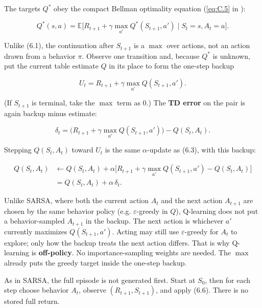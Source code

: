 The targets $Q^*$ obey the compact Bellman optimality equation (\eqref{eq:C.5} in ):

\begin{equation}
Q^*(s,a)
=
\mathbb{E}\bigl[R_{t+1}+\gamma\max_{a'} Q^*(S_{t+1},a')\mid S_t=s,A_t=a\bigr].
\tag{6.4}
\end{equation}

Unlike (6.1), the continuation after $S_{t+1}$ is a $\max$ over actions, not an action drawn from a behavior $\pi$. Observe one transition and, because $Q^*$ is unknown, put the current table estimate $Q$ in its place to form the one-step backup

\[
U_t=R_{t+1}+\gamma\max_{a'} Q(S_{t+1},a').
\]

(If $S_{t+1}$ is terminal, take the $\max$ term as $0$.) The \textbf{TD error} on the pair is again backup minus estimate:

\begin{equation}
\delta_t
=
\bigl(R_{t+1}+\gamma\max_{a'} Q(S_{t+1},a')\bigr) - Q(S_t,A_t).
\tag{6.5}
\end{equation}

Stepping $Q(S_t,A_t)$ toward $U_t$ is the same $\alpha$-update as (6.3), with this backup:

\begin{equation}
\begin{aligned}
Q(S_t,A_t)
&\leftarrow
Q(S_t,A_t)
+
\alpha\bigl[R_{t+1}+\gamma\max_{a'} Q(S_{t+1},a')-Q(S_t,A_t)\bigr]
\\
&=
Q(S_t,A_t)+\alpha\,\delta_t.
\end{aligned}
\tag{6.6}
\end{equation}

Unlike SARSA, where both the current action $A_t$ and the next action $A_{t+1}$ are chosen by the same behavior policy (e.g. $\varepsilon$-greedy in $Q$), Q-learning does not put a behavior-sampled $A_{t+1}$ in the backup. The next action is whichever $a'$ currently maximizes $Q(S_{t+1},a')$. Acting may still use $\varepsilon$-greedy for $A_t$ to explore; only how the backup treats the next action differs. That is why Q-learning is \textbf{off-policy}. No importance-sampling weights are needed. The $\max$ already puts the greedy target inside the one-step backup.

As in SARSA, the full episode is not generated first. Start at $S_0$, then for each step choose behavior $A_t$, observe $(R_{t+1},S_{t+1})$, and apply (6.6). There is no stored full return.

